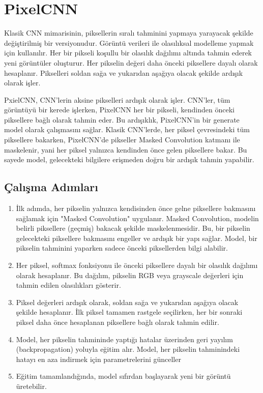 \section{PixelCNN}

Klasik CNN mimarisinin, piksellerin sıralı tahminini yapmaya yarayacak şekilde değiştirilmiş bir versiyonudur. Görüntü verileri ile olasılıksal modelleme yapmak için kullanılır. Her bir pikseli koşullu bir olasılık dağılımı altında tahmin ederek yeni görüntüler oluşturur. Her pikselin değeri daha önceki piksellere dayalı olarak hesaplanır. Pikselleri soldan sağa ve yukarıdan aşağıya olacak şekilde ardışık olarak işler.

PxielCNN, CNN'lerin aksine pikselleri ardışık olarak işler. CNN'ler, tüm görüntüyü bir kerede işlerken, PixelCNN her bir pikseli, kendinden önceki piksellere bağlı olarak tahmin eder. Bu ardışıklık, PixelCNN'in bir generate model olarak çalışmasını sağlar. Klasik CNN'lerde, her piksel çevresindeki tüm piksellere bakarken, PixelCNN'de pikseller Masked Convolution katmanı ile maskelenir, yani her piksel yalnızca kendinden önce gelen piksellere bakar. Bu sayede model, gelecekteki bilgilere erişmeden doğru bir ardışık tahmin yapabilir.

\subsection{Çalışma Adımları}

\begin{enumerate}
    \item İlk adımda, her pikselin yalnızca kendisinden önce gelne piksellere bakmasını sağlamak için "Masked Convolution" uygulanır. Masked Convolution, modelin belirli piksellere (geçmiş) bakacak şekilde maskelenmesidir. Bu, bir pikselin gelecekteki piksellere bakmasını engeller ve ardışık bir yapı sağlar. Model, bir pikselin tahminini yaparken sadece önceki piksellerden bilgi alabilir.
    \item Her piksel, softmax fonksiyonu ile önceki piksellere dayalı bir olasılık dağılımı olarak hesaplanır. Bu dağılım, pikselin RGB veya grayscale değerleri için tahmin edilen olasılıkları gösterir.
    \item Piksel değerleri ardışık olarak, soldan sağa ve yukarıdan aşağıya olacak şekilde hesaplanır. İlk piksel tamamen rastgele seçilirken, her bir sonraki piksel daha önce hesaplanan piksellere bağlı olarak tahmin edilir.
    \item Model, her pikselin tahmininde yaptığı hatalar üzerinden geri yayılım (backpropagation) yoluyla eğitim alır. Model, her pikselin tahminindeki hatayı en aza indirmek için parametrelerini günceller
    \item Eğitim tamamlandığında, model sıfırdan başlayarak yeni bir görüntü üretebilir.
\end{enumerate}

\newpage